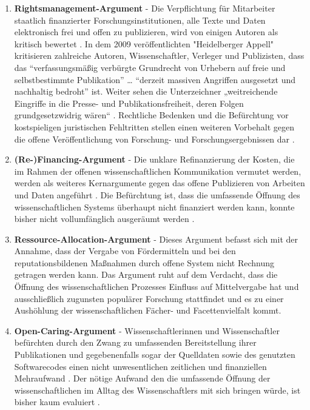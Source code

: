 \begin{enumerate}
\item \textbf{Rightsmanagement-Argument} - Die Verpflichtung für Mitarbeiter staatlich finanzierter Forschungsinstitutionen, alle Texte und Daten elektronisch frei und offen zu publizieren, wird von einigen Autoren als kritisch bewertet \cite{suchen}. In dem 2009 veröffentlichten "Heidelberger Appell" \cite{faz_heidelberger_apell_2009} kritisieren zahlreiche Autoren, Wissenschaftler, Verleger und Publizisten, dass das “verfassungsmäßig verbürgte Grundrecht von Urhebern auf freie und selbstbestimmte Publikation” … “derzeit massiven Angriffen ausgesetzt und nachhaltig bedroht” ist. Weiter sehen die Unterzeichner „weitreichende Eingriffe in die Presse- und Publikationsfreiheit, deren Folgen grundgesetzwidrig wären“ \cite{ITK_2009}. Rechtliche Bedenken und die Befürchtung vor kostspieligen juristischen Fehltritten stellen einen weiteren Vorbehalt gegen die offene Veröffentlichung von Forschung- und Forschungsergebnissen dar \cite{weishaupt_2009_goldenOA}.
\item \textbf{(Re-)Financing-Argument} - Die unklare Refinanzierung der Kosten, die im Rahmen der offenen wissenschaftlichen Kommunikation vermutet werden, werden als weiteres Kernargumente gegen das offene Publizieren von Arbeiten und Daten angeführt \cite{Chibnik_2015}. Die Befürchtung ist, dass die umfassende Öffnung des wissenschaftlichen Systems überhaupt nicht finanziert werden kann, konnte bisher nicht vollumfänglich ausgeräumt werden \cite{weishaupt_2009_goldenOA}.
\item \textbf{Ressource-Allocation-Argument} - Dieses Argument befasst sich mit der Annahme, dass der Vergabe von Fördermitteln und bei den reputationsbildenen Maßnahmen durch offene System nicht Rechnung getragen werden kann. Das Argument ruht auf dem Verdacht, dass die Öffnung des wissenschaftlichen Prozesses Einfluss auf Mittelvergabe hat \cite{grand_2012_open} und ausschließlich zugunsten populärer Forschung stattfindet und es zu einer Aushöhlung der wissenschaftlichen Fächer- und Facettenvielfalt kommt.
\item \textbf{Open-Caring-Argument} - Wissenschaftlerinnen und Wissenschaftler befürchten durch den Zwang zu umfassenden Bereitstellung ihrer Publikationen und gegebenenfalls sogar der Quelldaten sowie des genutzten Softwarecodes einen nicht unwesentlichen zeitlichen und finanziellen Mehraufwand \cite{bbaw_publizieren_2015} \cite{mennes_2013_making_os} \cite{grand_2012_open}. Der nötige Aufwand den die umfassende Öffnung der wissenschaftlichen im Alltag des Wissenschaftlers mit sich bringen würde, ist bisher kaum evaluiert \cite{osterloh2008anreize}.

\end{enumerate}
